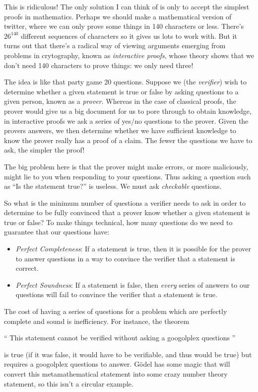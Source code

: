 \documentclass{article}
\theoremstyle{plain}
\theoremstyle{definition}
\begin{document}
%
This is ridiculous! The only solution I can think of is only to accept the simplest proofs in mathematics. Perhaps we should make a mathematical version of twitter, where we can only prove some things in 140 characters or less. There's $26^{140}$ different sequences of characters so it gives us lots to work with. But it turns out that there's a radical way of viewing arguments emerging from problems in crytography, known as \emph{interactive proofs}, whose theory shows that we don't need 140 characters to prove things: we only need three!

The idea is like that party game 20 questions. Suppose we (the \emph{verifier}) wish to determine whether a given statement is true or false by asking questions to a given person, known as a \emph{prover}. Whereas in the case of classical proofs, the prover would give us a big document for us to pore through to obtain knowledge, in interactive proofs we ask a series of yes/no questions to the prover. Given the provers answers, we then determine whether we have sufficient knowledge to know the prover really has a proof of a claim. The fewer the questions we have to ask, the simpler the proof!

The big problem here is that the prover might make errors, or more maliciously, might lie to you when responding to your questions. Thus asking a question such as ``Is the statement true?'' is useless. We must ask \emph{checkable} questions.

So what is the minimum number of questions a verifier needs to ask in order to determine to be fully convinced that a prover know whether a given statement is true or false? To make things technical, how many questions do we need to guarantee that our questions have:
%
\begin{itemize}
    \item \emph{Perfect Completeness}: If a statement is true, then it is possible for the prover to answer questions in a way to convince the verifier that a statement is correct.

    \item \emph{Perfect Soundness}: If a statement is false, then \emph{every} series of answers to our questions will fail to convince the verifier that a statement is true.
\end{itemize}
%
The cost of having a series of questions for a problem which are perfectly complete and sound is inefficiency. For instance, the theorem
%
\begin{center} `` This statement cannot be verified without asking a googolplex questions '' \end{center}
%
is true (if it was false, it would have to be verifiable, and thus would be true) but requires a googolplex questions to answer. G\"{o}del has some magic that will convert this metamathematical statement into some crazy number theory statement, so this isn't a circular example.
\end{document}
